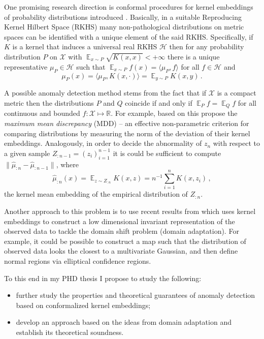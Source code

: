\documentclass{extarticle}
\newcommand{\ex}{\mathop{\mathbb{E}}\nolimits}
\newcommand{\Hcal}{\mathcal{H}}
\newcommand{\Xcal}{\mathcal{X}}
\newcommand{\Real}{\mathbb{R}}
\begin{document}
One promising research direction is conformal procedures for kernel embeddings of
probability distributions introduced \cite{smola2007}. Basically, in a suitable
Reproducing Kernel Hilbert Space (RKHS) many non-pathological distributions on metric
spaces can be identified with a unique element of the said RKHS. Specifically, if
$K$ is a kernel that induces a universal real RKHS $\Hcal$ then for any probability
distribution $P$ on $\Xcal$ with $\ex_{x\sim P} \sqrt{K(x,x)} < +\infty$ there is
a unique representative $\mu_P\in \Hcal$ such that $\ex_{x\sim P} f(x) = \langle \mu_P, f\rangle$
for all $f\in \Hcal$ and
\begin{equation*}
  \mu_P(x) = \langle \mu_P, K(x, \cdot) \rangle = \ex_{y\sim P} K(x, y) \,.
\end{equation*}

A possible anomaly detection method stems from the fact that if $\Xcal$ is a compact
metric then the distributions $P$ and $Q$ coincide if and only if $\ex_P f = \ex_Q f$
for all continuous and bounded $f:\Xcal\mapsto \Real$. For example, based on this
\cite{gretton2012} propose the \textit{maximum mean discrepancy} (MDD) -- an effective
non-parametric criterion for comparing distributions by measuring the norm of the
deviation of their kernel embeddings. Analogously, in order to decide the abnormality
of $z_n$ with respect to a given sample $Z_{:n-1} = (z_i)_{i=1}^{n-1}$ it is could
be sufficient to compute $\|\hat{\mu}_{:n} - \hat{\mu}_{:n-1}\|$, where
\begin{equation*}
  \hat{\mu}_{:n}(x) = \ex_{z\sim Z_{:n}} K(x, z) = n^{-1} \sum_{i=1}^n K(x, z_i) \,,
\end{equation*}
the kernel mean embedding of the empirical distribution of $Z_{:n}$.

Another approach to this problem is to use recent results from \cite{Baktashmotlaghetal2016}
which uses kernel embeddings to construct a low dimensional invariant representation
of the observed data to tackle the domain shift problem (domain adaptation). For
example, it could be possible to construct a map such that the distribution of observed
data looks the closest to a multivariate Gaussian, and then define normal regions
via elliptical confidence regions.

To this end in my PHD thesis I propose to study the following: \begin{itemize}
  \item further study the properties and theoretical guarantees of anomaly detection
  based on conformalized kernel embeddings;
  \item develop an approach based on the ideas from domain adaptation and establish
  its theoretical soundness.
\end{itemize}


% 
\clearpage


\end{document}
